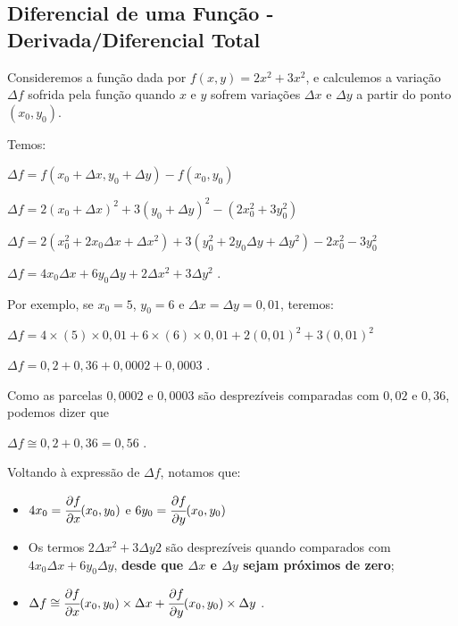 	\subsection{Diferencial de uma Função - Derivada/Diferencial Total \cite{morettin}}

		Consideremos a função dada por $f(x, y) = 2x^{2} + 3x^{2}$, e calculemos a variação $\Delta f$ sofrida pela função quando $x$ e $y$ sofrem variações $\Delta x$ e $\Delta y$ a partir do ponto $(x_{0}, y_{0})$.

		\medskip

		Temos:

		\medskip

		$\Delta f = f(x_{0} + \Delta x, y_{0} + \Delta y) - f(x_{0}, y_{0})$

		$\Delta f = 2(x_{0} + \Delta x)^{2} + 3(y_{0} + \Delta y)^{2} - (2x^{2}_{0} + 3y^{2}_{0})$

		$\Delta f = 2(x^{2}_{0} + 2x_{0}\Delta x + \Delta x^{2}) + 3(y^{2}_{0} + 2y_{0}\Delta y + \Delta y^{2}) - 2x^{2}_{0} - 3y^{2}_{0}$

		$\Delta f = 4x_{0}\Delta x + 6y_{0}\Delta y + 2\Delta x^{2} + 3\Delta y^{2}$ .

		\medskip

		Por exemplo, se $x_{0} = 5$, $y_{0} = 6$ e $\Delta x = \Delta y = 0,01$, teremos:

		\medskip

		$\Delta f = 4 \times (5) \times 0,01 + 6 \times (6) \times 0,01 + 2(0,01)^{2} + 3(0,01)^{2}$

		$\Delta f = 0,2 + 0,36 + 0,0002 + 0,0003$ .

		\medskip

		Como as parcelas $0,0002$ e $0,0003$ são desprezíveis comparadas com $0,02$ e $0,36$, podemos dizer que

		\medskip

		$\Delta f \cong 0,2 + 0,36 = 0,56$ .

		\medskip

		Voltando à expressão de $\Delta f$, notamos que:

		\begin{itemize}

			\item $4x_{0} = \cfrac{\partial f}{\partial x} (x_{0}, y_{0})$ e $6y_{0} = \cfrac{\partial f}{\partial y} (x_{0}, y_{0})$

			\item Os termos $2\Delta x^{2} + 3\Delta y{2}$ são desprezíveis quando comparados com $4x_{0}\Delta x + 6y_{0}\Delta y$, \textbf{desde que $\Delta x$ e $\Delta y$ sejam próximos de zero};

			\item $\Delta f \cong \cfrac{\partial f}{\partial x} (x_{0}, y_{0}) \times \Delta x + \cfrac{\partial f}{\partial y} (x_{0}, y_{0}) \times \Delta y$ .

		\end{itemize}

